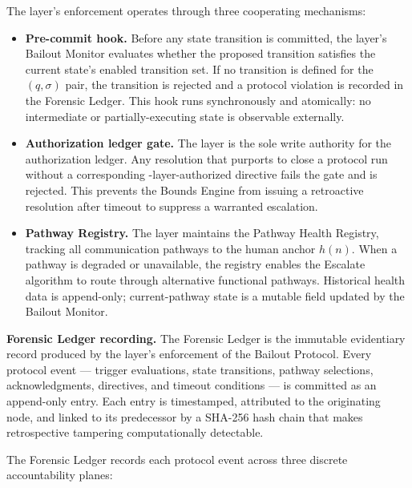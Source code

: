 The \fact{} layer's enforcement operates through three cooperating mechanisms:

\begin{itemize}\itemsep=0pt
\item[(\textit{i})] \textbf{Pre-commit hook.} Before any state transition is committed, the \fact{} layer's Bailout Monitor evaluates whether the proposed transition satisfies the current state's enabled transition set. If no transition is defined for the $(q,\sigma)$ pair, the transition is rejected and a protocol violation is recorded in the Forensic Ledger. This hook runs synchronously and atomically: no intermediate or partially-executing state is observable externally.

\item[(\textit{ii})] \textbf{Authorization ledger gate.} The \fact{} layer is the sole write authority for the authorization ledger. Any resolution that purports to close a protocol run without a corresponding \purpose-layer-authorized directive fails the gate and is rejected. This prevents the Bounds Engine from issuing a retroactive resolution after timeout to suppress a warranted escalation.

\item[(\textit{iii})] \textbf{Pathway Registry.} The \fact{} layer maintains the Pathway Health Registry, tracking all communication pathways to the human anchor $h(n)$. When a pathway is degraded or unavailable, the registry enables the Escalate algorithm to route through alternative functional pathways. Historical health data is append-only; current-pathway state is a mutable field updated by the Bailout Monitor.
\end{itemize}

\medskip\noindent\textbf{Forensic Ledger recording.} The Forensic Ledger is the immutable evidentiary record produced by the \fact{} layer's enforcement of the Bailout Protocol. Every protocol event — trigger evaluations, state transitions, pathway selections, acknowledgments, directives, and timeout conditions — is committed as an append-only entry. Each entry is timestamped, attributed to the originating node, and linked to its predecessor by a SHA-256 hash chain that makes retrospective tampering computationally detectable.

The Forensic Ledger records each protocol event across three discrete accountability planes:

